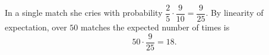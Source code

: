In a single match she cries with probability $\dfrac25\cdot\dfrac9{10}=\dfrac9{25}$. By linearity of expectation, over $50$ matches the expected number of times is
\[50\cdot\dfrac9{25}=\boxed{18}.\]

